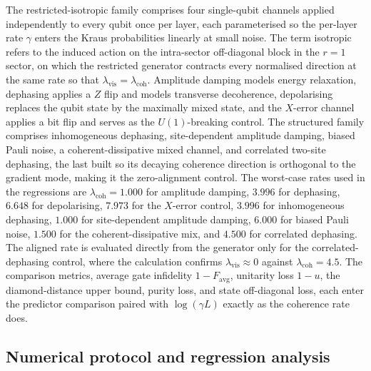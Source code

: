 \documentclass{article}
\newcommand{\lcoh}{\lambda_{\mathrm{coh}}}
\newcommand{\lvis}{\lambda_{\mathrm{vis}}}
\begin{document}
The restricted-isotropic family comprises four single-qubit channels applied independently to every qubit once per layer, each parameterised so the per-layer rate $\gamma$ enters the Kraus probabilities linearly at small noise. The term isotropic refers to the induced action on the intra-sector off-diagonal block in the $r=1$ sector, on which the restricted generator contracts every normalised direction at the same rate so that $\lvis=\lcoh$. Amplitude damping models energy relaxation, dephasing applies a $Z$ flip and models transverse decoherence, depolarising replaces the qubit state by the maximally mixed state, and the $X$-error channel applies a bit flip and serves as the $U(1)$-breaking control. The structured family comprises inhomogeneous dephasing, site-dependent amplitude damping, biased Pauli noise, a coherent-dissipative mixed channel, and correlated two-site dephasing, the last built so its decaying coherence direction is orthogonal to the gradient mode, making it the zero-alignment control. The worst-case rates used in the regressions are $\lcoh=1.000$ for amplitude damping, $3.996$ for dephasing, $6.648$ for depolarising, $7.973$ for the $X$-error control, $3.996$ for inhomogeneous dephasing, $1.000$ for site-dependent amplitude damping, $6.000$ for biased Pauli noise, $1.500$ for the coherent-dissipative mix, and $4.500$ for correlated dephasing. The aligned rate is evaluated directly from the generator only for the correlated-dephasing control, where the calculation confirms $\lvis\approx0$ against $\lcoh=4.5$. The comparison metrics, average gate infidelity $1-F_{\mathrm{avg}}$, unitarity loss $1-u$, the diamond-distance upper bound, purity loss, and state off-diagonal loss, each enter the predictor comparison paired with $\log(\gamma L)$ exactly as the coherence rate does.

\subsection{Numerical protocol and regression analysis}
\end{document}
